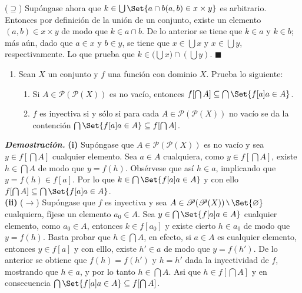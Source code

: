 \documentclass[12pt]{article}
\providecommand\given{}
\renewcommand{\emptyset}{\varnothing}
\newcounter{A}
\newenvironment{ejercicio}{\begin{enumerate}[\bfseries \text{EJ \theA}.]\item}{\end{enumerate}\stepcounter{A}}
\newcommand{\mysetminusD}{\hbox{\tikz{\draw[line width=0.6pt,line cap=round] (3pt,0) -- (0,6pt);}}}
\newcommand{\mysetminusT}{\mysetminusD}
\newcommand{\mysetminusS}{\hbox{\tikz{\draw[line width=0.45pt,line cap=round] (2pt,0) -- (0,4pt);}}}
\newcommand{\mysetminusSS}{\hbox{\tikz{\draw[line width=0.4pt,line cap=round] (1.5pt,0) -- (0,3pt);}}}
\newcommand{\mysetminus}{\mathbin{\mathchoice{\mysetminusD}{\mysetminusT}{\mysetminusS}{\mysetminusSS}}}
\renewcommand{\setminus}{\mysetminus}
\newcommand{\QED}{\hfill\ensuremath{\blacksquare}}
\begin{document}
    (\(\supseteq\)) Supóngase ahora que \(k \in \bigcup \Set{ a \cap b \given (a,b) \in x \times y }\) es arbitrario. Entonces por definición de la unión de un conjunto, existe un elemento \((a,b) \in x \times y\) de modo que \(k \in a \cap b\). De lo anterior se tiene que \(k \in a\) y \(k \in b\); más aún, dado que \(a \in x\) y \(b \in y\), se tiene que \(x \in \bigcup x\) y \(x \in \bigcup y\), respectivamente. Lo que prueba que \( k \in ( \bigcup x \big) \cap ( \bigcup y ) \). \QED

    \begin{ejercicio}
        Sean $X$ un conjunto y $f$ una función con dominio $X$. Prueba lo siguiente:
        \begin{enumerate}
            \item Si $A \in \mathscr{P}(\mathscr{P}(X))$ es no vacío, entonces $f[\bigcap A] \subseteq \bigcap \Set{f[a] \given a \in A} $.
            \item $f$ es inyectiva si y sólo si para cada $A \in \mathscr{P}(\mathscr{P}(X))$ no vacío se da la contención $\bigcap \Set{f[a] \given a \in A} \subseteq f[\bigcap A]$.
        \end{enumerate}
    \end{ejercicio}

    \textbf{\textit{Demostración.}} \textbf{(i)} Supóngase que $A \in \mathscr{P}(\mathscr{P}(X))$ es no vacío y sea \(y \in f[\bigcap A]\) cualquier elemento. Sea \(a \in A\) cualquiera, como \(y \in f[\bigcap A]\), existe \(h \in \bigcap A\) de modo que \(y=f(h)\). Obsérvese que así \(h \in a\), implicando que \(y=f(h) \in f[a]\). Por lo que \(k \in \bigcap\Set{f[a] \given a \in A}\) y con ello $f[\bigcap A] \subseteq \bigcap \Set{f[a] \given a \in A} $. \\

    \textbf{(ii)} (\(\rightarrow\)) Supóngase que \(f\) es inyectiva y sea $A \in \mathscr{P}(\mathscr{P}(X)) \setminus \Set{\emptyset}$ cualquiera, fíjese un elemento \(a_0 \in A\). Sea \(y \in \bigcap \Set{f[a] \given a \in A}\) cualquier elemento, como \(a_0 \in A\), entonces \(k \in f[a_0]\) y existe cierto \(h \in a_0\) de modo que \(y=f(h)\). Basta probar que \(h \in \bigcap A\), en efecto, si \(a \in A\) es cualquier elemento, entonces \(y \in f[a]\) y con elllo, existe \(h' \in a\) de modo que \(y=f(h')\). De lo anterior se obtiene que \(f(h)=f(h')\) y \(h=h'\) dada la inyectividad de \(f\), mostrando que \(h \in a\), y por lo tanto \(h \in \bigcap A\). Asi que \(h \in f[\bigcap A]\) y en consecuencia \(\bigcap \Set{f[a] \given a \in A} \subseteq f[\bigcap A]\).
\end{document}
